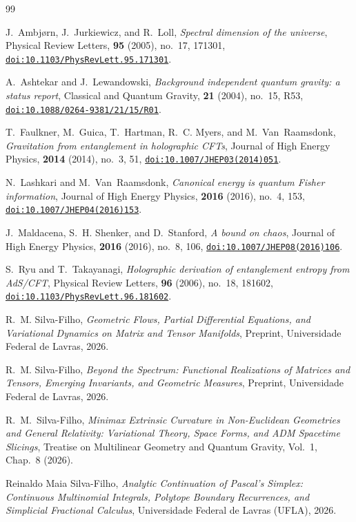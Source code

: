 \documentclass[11pt,a4paper,reqno]{amsart}
\theoremstyle{definition}
\numberwithin{equation}{section}
\providecommand{\doi}[1]{\href{https://doi.org/#1}{\nolinkurl{doi:#1}}}
\providecommand{\doi}[1]{\href{https://doi.org/#1}{\nolinkurl{doi:#1}}}
\begin{document}
\begin{thebibliography}{99}

J.~Ambj{\o}rn, J.~Jurkiewicz, and R.~Loll,
\emph{Spectral dimension of the universe},
Physical Review Letters, \textbf{95} (2005), no.~17, 171301,
\doi{10.1103/PhysRevLett.95.171301}.

A.~Ashtekar and J.~Lewandowski,
\emph{Background independent quantum gravity: a status report},
Classical and Quantum Gravity, \textbf{21} (2004), no.~15, R53,
\doi{10.1088/0264-9381/21/15/R01}.

T.~Faulkner, M.~Guica, T.~Hartman, R.~C. Myers, and M.~Van~Raamsdonk,
\emph{Gravitation from entanglement in holographic CFTs},
Journal of High Energy Physics, \textbf{2014} (2014), no.~3, 51,
\doi{10.1007/JHEP03(2014)051}.

N.~Lashkari and M.~Van~Raamsdonk,
\emph{Canonical energy is quantum Fisher information},
Journal of High Energy Physics, \textbf{2016} (2016), no.~4, 153,
\doi{10.1007/JHEP04(2016)153}.

J.~Maldacena, S.~H. Shenker, and D.~Stanford,
\emph{A bound on chaos},
Journal of High Energy Physics, \textbf{2016} (2016), no.~8, 106,
\doi{10.1007/JHEP08(2016)106}.

S.~Ryu and T.~Takayanagi,
\emph{Holographic derivation of entanglement entropy from AdS/CFT},
Physical Review Letters, \textbf{96} (2006), no.~18, 181602,
\doi{10.1103/PhysRevLett.96.181602}.

R.~M. Silva-Filho,
\emph{Geometric Flows, Partial Differential Equations, and Variational Dynamics on Matrix and Tensor Manifolds},
Preprint, Universidade Federal de Lavras, 2026.

R.~M. Silva-Filho,
\emph{Beyond the Spectrum: Functional Realizations of Matrices and Tensors, Emerging Invariants, and Geometric Measures},
Preprint, Universidade Federal de Lavras, 2026.

R.~M.~Silva-Filho,
\emph{Minimax Extrinsic Curvature in Non-Euclidean Geometries and General Relativity: Variational Theory, Space Forms, and ADM Spacetime Slicings},
Treatise on Multilinear Geometry and Quantum Gravity, Vol.~1, Chap.~8 (2026).

Reinaldo Maia Silva-Filho,
\emph{Analytic Continuation of Pascal's Simplex: Continuous Multinomial Integrals, Polytope Boundary Recurrences, and Simplicial Fractional Calculus},
Universidade Federal de Lavras (UFLA), 2026.


\end{thebibliography}
\end{document}
